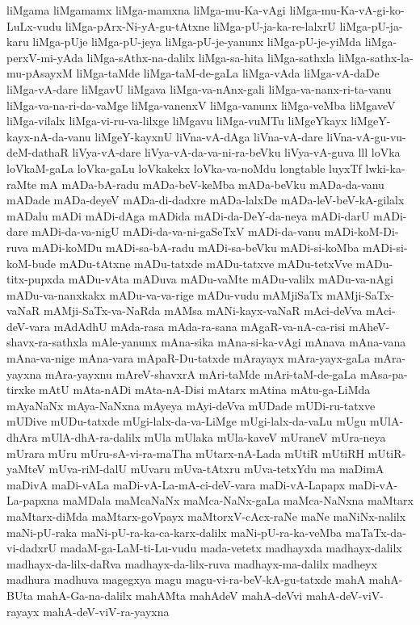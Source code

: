 {liMgama
liMgamamx
liMga-mamxna
liMga-mu-Ka-vAgi
liMga-mu-Ka-vA-gi-ko-LuLx-vudu
liMga-pArx-Ni-yA-gu-tAtxne
liMga-pU-ja-ka-re-lalxrU
liMga-pU-ja-karu
liMga-pUje
liMga-pU-jeya
liMga-pU-je-yanunx
liMga-pU-je-yiMda
liMga-perxV-mi-yAda
liMga-sAthx-na-dalilx
liMga-sa-hita
liMga-sathxla
liMga-sathx-la-mu-pAsayxM
liMga-taMde
liMga-taM-de-gaLa
liMga-vAda
liMga-vA-daDe
liMga-vA-dare
liMgavU
liMgava
liMga-va-nAnx-gali
liMga-va-nanx-ri-ta-vanu
liMga-va-na-ri-da-vaMge
liMga-vanenxV
liMga-vanunx
liMga-veMba
liMgaveV
liMga-vilalx
liMga-vi-ru-va-lilxge
liMgavu
liMga-vuMTu
liMgeYkayx
liMgeY-kayx-nA-da-vanu
liMgeY-kayxnU
liVna-vA-dAga
liVna-vA-dare
liVna-vA-gu-vu-deM-dathaR
liVya-vA-dare
liVya-vA-da-va-ni-ra-beVku
liVya-vA-guva
lll
loVka
loVkaM-gaLa
loVka-gaLu
loVkakekx
loVka-va-noMdu
longtable
luyxTf
lwki-ka-raMte
mA
mADa-bA-radu
mADa-beV-keMba
mADa-beVku
mADa-da-vanu
mADade
mADa-deyeV
mADa-di-dadxre
mADa-lalxDe
mADa-leV-beV-kA-gilalx
mADalu
mADi
mADi-dAga
mADida
mADi-da-DeY-da-neya
mADi-darU
mADi-dare
mADi-da-va-nigU
mADi-da-va-ni-gaSeTxV
mADi-da-vanu
mADi-koM-Di-ruva
mADi-koMDu
mADi-sa-bA-radu
mADi-sa-beVku
mADi-si-koMba
mADi-si-koM-bude
mADu-tAtxne
mADu-tatxde
mADu-tatxve
mADu-tetxVve
mADu-titx-pupxda
mADu-vAta
mADuva
mADu-vaMte
mADu-valilx
mADu-va-nAgi
mADu-va-nanxkakx
mADu-va-va-rige
mADu-vudu
mAMjiSaTx
mAMji-SaTx-vaNaR
mAMji-SaTx-va-NaRda
mAMsa
mANi-kayx-vaNaR
mAci-deVva
mAci-deV-vara
mAdAdhU
mAda-rasa
mAda-ra-sana
mAgaR-va-nA-ca-risi
mAheV-shavx-ra-sathxla
mAle-yanunx
mAna-sika
mAna-si-ka-vAgi
mAnava
mAna-vana
mAna-va-nige
mAna-vara
mApaR-Du-tatxde
mArayayx
mAra-yayx-gaLa
mAra-yayxna
mAra-yayxnu
mAreV-shavxrA
mAri-taMde
mAri-taM-de-gaLa
mAsa-pa-tirxke
mAtU
mAta-nADi
mAta-nA-Disi
mAtarx
mAtina
mAtu-ga-LiMda
mAyaNaNx
mAya-NaNxna
mAyeya
mAyi-deVva
mUDade
mUDi-ru-tatxve
mUDive
mUDu-tatxde
mUgi-lalx-da-va-LiMge
mUgi-lalx-da-vaLu
mUgu
mUlA-dhAra
mUlA-dhA-ra-dalilx
mUla
mUlaka
mUla-kaveV
mUraneV
mUra-neya
mUrara
mUru
mUru-sA-vi-ra-maTha
mUtarx-nA-Lada
mUtiR
mUtiRH
mUtiR-yaMteV
mUva-riM-dalU
mUvaru
mUva-tAtxru
mUva-tetxYdu
ma
maDimA
maDivA
maDi-vALa
maDi-vA-La-mA-ci-deV-vara
maDi-vA-Lapapx
maDi-vA-La-papxna
maMDala
maMcaNaNx
maMca-NaNx-gaLa
maMca-NaNxna
maMtarx
maMtarx-diMda
maMtarx-goVpayx
maMtorxV-cAcx-raNe
maNe
maNiNx-nalilx
maNi-pU-raka
maNi-pU-ra-ka-ca-karx-dalilx
maNi-pU-ra-ka-veMba
maTaTx-da-vi-dadxrU
madaM-ga-LaM-ti-Lu-vudu
mada-vetetx
madhayxda
madhayx-dalilx
madhayx-da-lilx-daRva
madhayx-da-lilx-ruva
madhayx-ma-dalilx
madheyx
madhura
madhuva
magegxya
magu
magu-vi-ra-beV-kA-gu-tatxde
mahA
mahA-BUta
mahA-Ga-na-dalilx
mahAMta
mahAdeV
mahA-deVvi
mahA-deV-viV-rayayx
mahA-deV-viV-ra-yayxna
}
